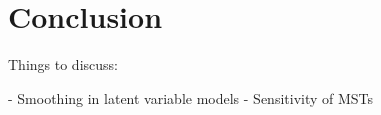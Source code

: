 \chapter{Conclusion}\label{ch:conclusionchap} %

Things to discuss:

- Smoothing in latent variable models
- Sensitivity of MSTs

